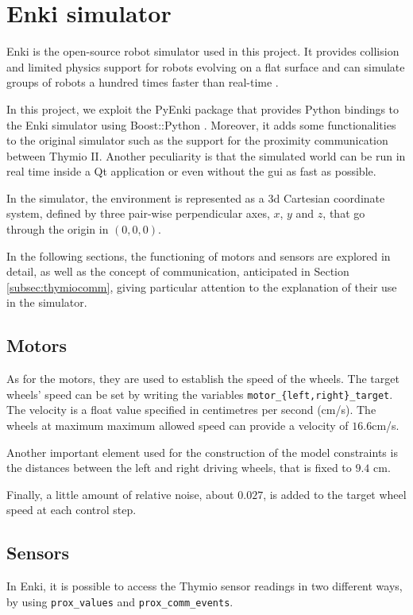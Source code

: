 \section{Enki simulator}
\label{sec:enki}

Enki is the open-source robot simulator used in this project. It provides collision 
and limited physics support for robots evolving on a flat surface and can simulate 
groups of robots a hundred times faster than real-time \cite[][]{enki}.

In this project, we exploit the PyEnki package \cite[][]{enki-jguzzi} that provides 
Python bindings to the Enki simulator using Boost::Python 
\cite[][]{boostpython}.
Moreover, it adds some functionalities to the original simulator such as the 
support for the proximity communication between Thymio II.
Another peculiarity is that the simulated world can be run in real time inside a Qt 
application or even without the \gls{gui} as fast as possible.

In the simulator, the environment is represented as a \gls{3d} Cartesian 
coordinate system, defined by three pair-wise perpendicular axes, $x$, $y$ and 
$z$, that go through the origin in $(0, 0, 0)$. 

In the following sections, the functioning of motors and sensors are explored in 
detail, as well as the concept of communication, anticipated in Section 
\ref{subsec:thymiocomm}, giving particular attention to the explanation of their 
use in the simulator.

\subsection{Motors}
\label{subsec:enkimotors}
As for the motors, they are used to establish the speed of the wheels. The target 
wheels' speed can be set by writing the variables 
\texttt{motor\_\{left,right\}\_target}. The velocity is a float value specified in 
centimetres per second (cm/s).
The wheels at maximum maximum allowed speed can provide a velocity of 
$16.6$cm/s.

Another important element used for the construction of the model constraints is 
the distances between the left and right driving wheels, that is fixed to $9.4$ 
cm.

Finally, a little amount of relative noise, about $0.027$, is added to the target 
wheel speed at each control step.

\subsection{Sensors}
\label{subsec:enkisensors}
In Enki, it is possible to access the Thymio sensor readings in two different ways, 
by using \texttt{prox\_values} and \texttt{prox\_comm\_events}.

